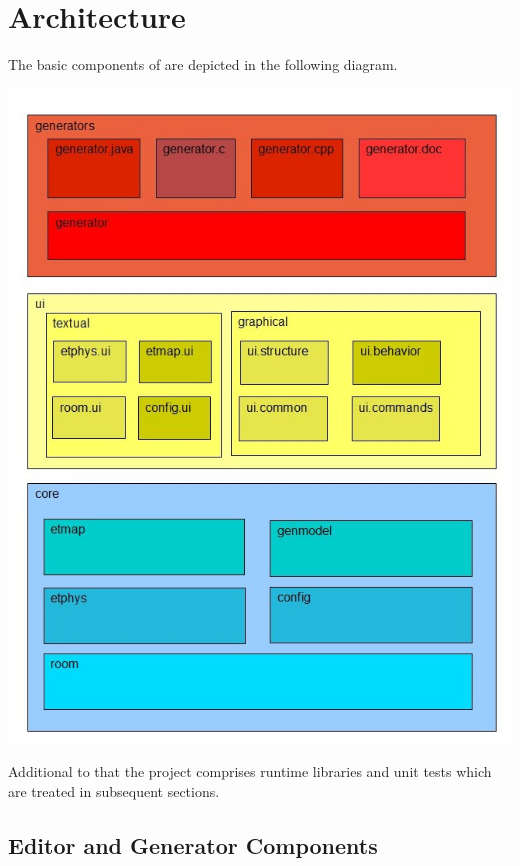 \section{Architecture}

The basic components of \eTrice{} are depicted in the following diagram.

\includegraphics[scale=0.5]{images/200-components.jpg}

Additional to that the \eTrice{} project comprises runtime libraries and unit tests which are treated in 
subsequent sections.

\subsection{Editor and Generator Components}

